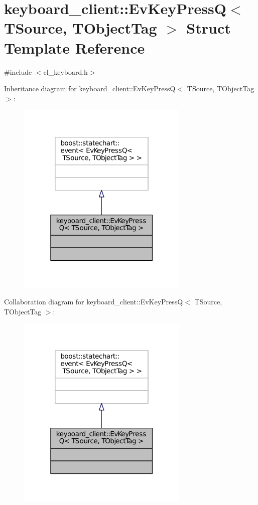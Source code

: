\hypertarget{structkeyboard__client_1_1EvKeyPressQ}{}\section{keyboard\+\_\+client\+:\+:Ev\+Key\+PressQ$<$ T\+Source, T\+Object\+Tag $>$ Struct Template Reference}
\label{structkeyboard__client_1_1EvKeyPressQ}


{\ttfamily \#include $<$cl\+\_\+keyboard.\+h$>$}



Inheritance diagram for keyboard\+\_\+client\+:\+:Ev\+Key\+PressQ$<$ T\+Source, T\+Object\+Tag $>$\+:
\nopagebreak
\begin{figure}[H]
\begin{center}
\leavevmode
\includegraphics[width=232pt]{structkeyboard__client_1_1EvKeyPressQ__inherit__graph}
\end{center}
\end{figure}


Collaboration diagram for keyboard\+\_\+client\+:\+:Ev\+Key\+PressQ$<$ T\+Source, T\+Object\+Tag $>$\+:
\nopagebreak
\begin{figure}[H]
\begin{center}
\leavevmode
\includegraphics[width=232pt]{structkeyboard__client_1_1EvKeyPressQ__coll__graph}
\end{center}
\end{figure}


